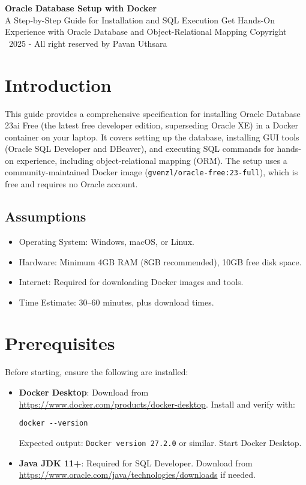 \documentclass[a4paper,12pt]{article}
\begin{document}
\begin{titlepage}
  \centering
  \vspace*{2cm}
  \Huge\textbf{Oracle Database Setup with Docker \\} 
  \vspace{1cm}
  \Large A Step-by-Step Guide for Installation and SQL Execution
  \vspace{2cm}
  \normalsize Get Hands-On Experience with Oracle Database and Object-Relational Mapping 
  \vspace{1cm}
  \normalsize Copyright \textcopyright\ 2025 - All right reserved by Pavan Uthsara
  \vfill
\end{titlepage}

\tableofcontents
\newpage

\section{Introduction}
This guide provides a comprehensive specification for installing Oracle Database 23ai Free (the latest free developer edition, superseding Oracle XE) in a Docker container on your laptop. It covers setting up the database, installing GUI tools (Oracle SQL Developer and DBeaver), and executing SQL commands for hands-on experience, including object-relational mapping (ORM). The setup uses a community-maintained Docker image (\texttt{gvenzl/oracle-free:23-full}), which is free and requires no Oracle account.

\subsection{Assumptions}
\begin{itemize}
  \item Operating System: Windows, macOS, or Linux.
  \item Hardware: Minimum 4GB RAM (8GB recommended), 10GB free disk space.
  \item Internet: Required for downloading Docker images and tools.
  \item Time Estimate: 30--60 minutes, plus download times.
\end{itemize}

\section{Prerequisites}
Before starting, ensure the following are installed:
\begin{itemize}
  \item \textbf{Docker Desktop}: Download from \url{https://www.docker.com/products/docker-desktop}. Install and verify with:
    \begin{lstlisting}
docker --version
    \end{lstlisting}
    Expected output: \texttt{Docker version 27.2.0} or similar. Start Docker Desktop.
  \item \textbf{Java JDK 11+}: Required for SQL Developer. Download from \url{https://www.oracle.com/java/technologies/downloads} if needed.
\end{itemize}
\end{document}
